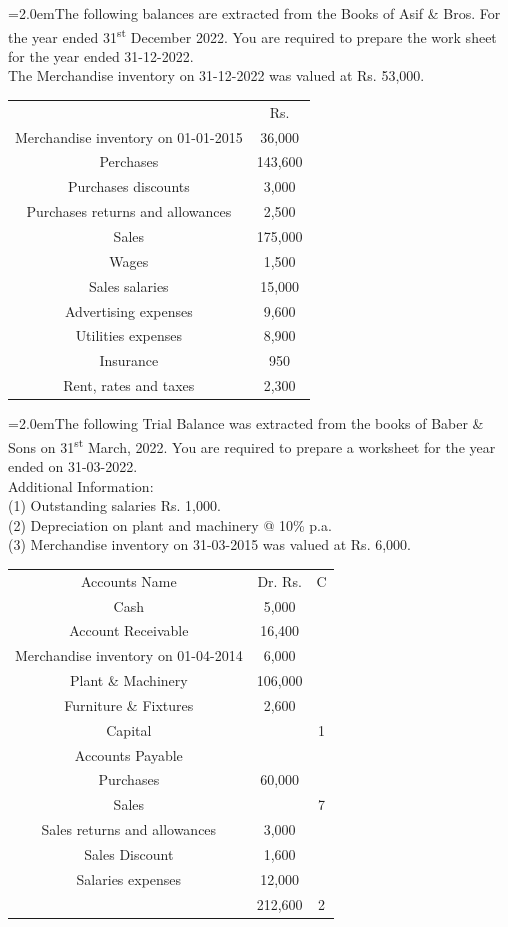 \documentclass[11pt,a4paper]{article}
\newcommand{\lqn}[2]{\Needspace{6\baselineskip}\par\medskip\noindent\hangindent=2.0em\hangafter=1\makebox[2.0em][l]{\textbf{#1.}}#2\par}
\begin{document}
\lqn{109}{The following balances are extracted from the Books of Asif \& Bros. For the year ended 31\textsuperscript{st}  December 2022. You are required to prepare the work sheet for the year ended 31-12-2022.\\
The Merchandise inventory on 31-12-2022 was valued at Rs. 53,000.\par
\par\smallskip\noindent\hspace*{1.2em}\begin{tabular}{|cc|}
\hline
 & Rs. \\
Merchandise inventory on 01-01-2015 & 36,000 \\
Perchases & 143,600 \\
Purchases discounts & 3,000 \\
Purchases returns and allowances & 2,500 \\
Sales & 175,000 \\
Wages & 1,500 \\
Sales salaries & 15,000 \\
Advertising expenses & 9,600 \\
Utilities expenses & 8,900 \\
Insurance & 950 \\
Rent, rates and taxes & 2,300 \\
\hline
\end{tabular}\par\smallskip
}
\lqn{110}{The following Trial Balance was extracted from the books of Baber \& Sons on 31\textsuperscript{st}  March, 2022. You are required to prepare a worksheet for the year ended on 31-03-2022.\\
Additional Information:\\
(1) Outstanding salaries Rs. 1,000.\\
(2) Depreciation on plant and machinery @ 10\% p.a.\\
(3) Merchandise inventory on 31-03-2015 was valued at Rs. 6,000.\par
\par\smallskip\noindent\hspace*{1.2em}\begin{tabular}{|ccc|}
\hline
Accounts Name & Dr. Rs. & C \\
Cash & 5,000 &  \\
Account Receivable & 16,400 &  \\
Merchandise inventory on 01-04-2014 & 6,000 &  \\
Plant \& Machinery & 106,000 &  \\
Furniture \& Fixtures & 2,600 &  \\
Capital &  & 1 \\
Accounts Payable &  &  \\
Purchases & 60,000 &  \\
Sales &  & 7 \\
Sales returns and allowances & 3,000 &  \\
Sales Discount & 1,600 &  \\
Salaries expenses & 12,000 &  \\
 & 212,600 & 2 \\
\hline
\end{tabular}\par\smallskip
}
\end{document}
